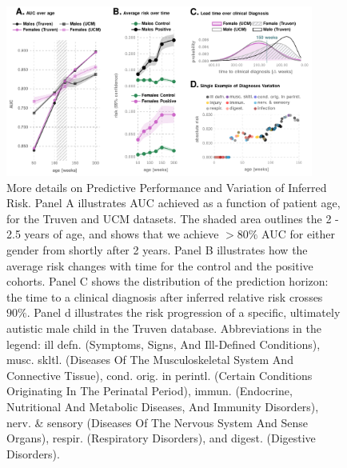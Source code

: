 \documentclass[onecolumn, compsoc,11pt]{IEEEtran}
\renewcommand{\captionN}[1]{\caption{\color{CadetBlue4!80!black} \sffamily \fontsize{9}{10}\selectfont #1  }}
\def\treatment{positive\xspace}
\begin{document}
\begin{figure}[!ht]
  
  \centering 
   \includegraphics[width=0.9\textwidth]{Figures/test-figure0}
   \vspace{-15pt}

    \captionN{More details on Predictive Performance and Variation of Inferred Risk. Panel A illustrates AUC achieved as a function of
      patient age, for the Truven and UCM datasets. The shaded area outlines the 2 - 2.5  years of age, and  shows that we achieve $>80\%$ AUC for either gender from shortly after 2 years.   Panel B illustrates how the average risk changes with time for the control and the positive cohorts. Panel C shows the distribution of the prediction horizon: the time to a clinical diagnosis after inferred  relative risk crosses $90\%$. Panel d illustrates the risk progression of a specific, ultimately autistic male child in the Truven database. Abbreviations in the legend: ill defn. (Symptoms, Signs, And Ill-Defined Conditions),   musc. skltl. (Diseases Of The Musculoskeletal System And Connective Tissue), cond. orig. in perintl. (Certain Conditions Originating In The Perinatal Period), immun. (Endocrine, Nutritional And Metabolic Diseases, And Immunity Disorders), nerv. \& sensory (Diseases Of The Nervous System And Sense Organs), respir. (Respiratory Disorders), and digest. (Digestive Disorders). %
    }\label{fig2}
       \vspace{-15pt}

\end{figure}
\end{document}
